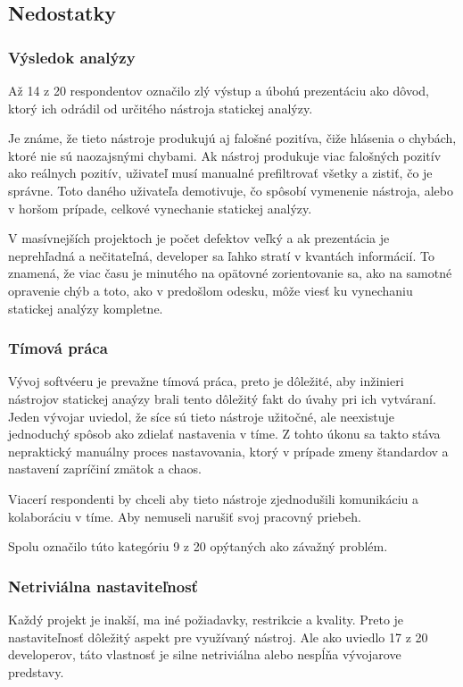 \documentclass[11pt,twoside,slovak,a4paper]{article}
\begin{document}
\subsection{Nedostatky} \label{vyuzitie:nedostatky}
\subsubsection*{Výsledok analýzy}
Až 14 z 20 respondentov označilo zlý výstup a úbohú prezentáciu ako dôvod, ktorý ich odrádil od určitého nástroja
statickej analýzy.

Je známe, že tieto nástroje produkujú aj falošné pozitíva, čiže hlásenia o chybách, ktoré nie sú
naozajsnými chybami. Ak nástroj produkuje viac falošných pozitív ako reálnych pozitív, uživateľ musí manualné
prefiltrovať všetky a zistiť, čo je správne. Toto daného uživateľa demotivuje, čo spôsobí vymenenie nástroja, alebo v
horšom prípade, celkové vynechanie statickej analýzy.

V masívnejších projektoch je počet defektov veľký a ak prezentácia je neprehľadná a nečitateľná, developer sa ľahko
stratí v kvantách informácií. To znamená, že viac času je minutého na opätovné zorientovanie sa, ako na samotné
opravenie chýb a toto, ako v predošlom odesku, môže viesť ku vynechaniu statickej analýzy kompletne.

\subsubsection*{Tímová práca}
Vývoj softvéeru je prevažne tímová práca, preto je dôležité, aby inžinieri nástrojov statickej anaýzy brali tento
dôležitý fakt do úvahy pri ich vytváraní. Jeden vývojar uviedol, že síce sú tieto nástroje užitočné, ale neexistuje
jednoduchý spôsob ako zdielať nastavenia v tíme. Z tohto úkonu sa takto stáva nepraktický manuálny proces nastavovania,
ktorý v prípade zmeny štandardov a nastavení zapríčiní zmätok a chaos.

Viacerí respondenti by chceli aby tieto nástroje zjednodušili komunikáciu a kolaboráciu v tíme. Aby nemuseli narušiť
svoj pracovný priebeh.

Spolu označilo túto kategóriu 9 z 20 opýtaných ako závažný problém.

\subsubsection*{Netriviálna nastaviteľnosť}
Každý projekt je inakší, ma iné požiadavky, restrikcie a kvality. Preto je nastaviteľnosť dôležitý aspekt pre využívaný
nástroj. Ale ako uviedlo 17 z 20 developerov, táto vlastnosť je silne netriviálna alebo nespĺňa vývojarove predstavy.
\end{document}
